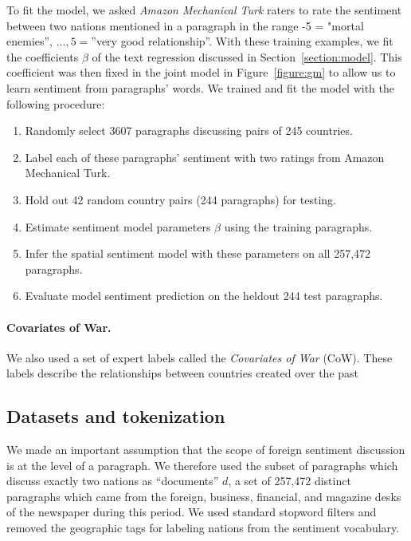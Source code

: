 To fit the model, we asked \emph{Amazon Mechanical Turk} raters to rate the
sentiment between two nations mentioned in a paragraph in the range -5
= "mortal enemies'', $\ldots, 5 = $''very good relationship''.
With these training examples, we fit the coefficients $\beta$ of the
text regression discussed in Section~\ref{section:model}.  This
coefficient was then fixed in the joint model in
Figure~\ref{figure:gm} to allow us to learn sentiment from
paragraphs' words.  We trained and fit the model with the following procedure:

\begin{enumerate}
  \item Randomly select 3607 paragraphs discussing pairs of 245 countries.
  \item Label each of these paragraphs' sentiment with two ratings
    from Amazon Mechanical Turk.
  \item Hold out 42 random country pairs (244 paragraphs) for testing.
  \item Estimate sentiment model parameters $\beta$ using the training
    paragraphs.
  \item Infer the spatial sentiment model with these parameters on
    all 257,472 paragraphs.
  \item Evaluate model sentiment prediction on the heldout 244 test
    paragraphs.
\end{enumerate}

\paragraph{Covariates of War.}  We also used a set of expert labels
called the \emph{Covariates of War} (CoW).  These labels describe the
relationships between countries created over the past

\subsection{Datasets and tokenization}  We made an important
assumption that the scope of foreign sentiment discussion is at the
level of a paragraph.  We therefore used the subset of paragraphs
which discuss exactly two nations as ``documents'' $d$, a set of
257,472 distinct paragraphs which came from the foreign, business,
financial, and magazine desks of the newspaper during this period. We
used standard stopword filters and removed the geographic tags for
labeling nations from the sentiment vocabulary.

\label{section:experiments}

